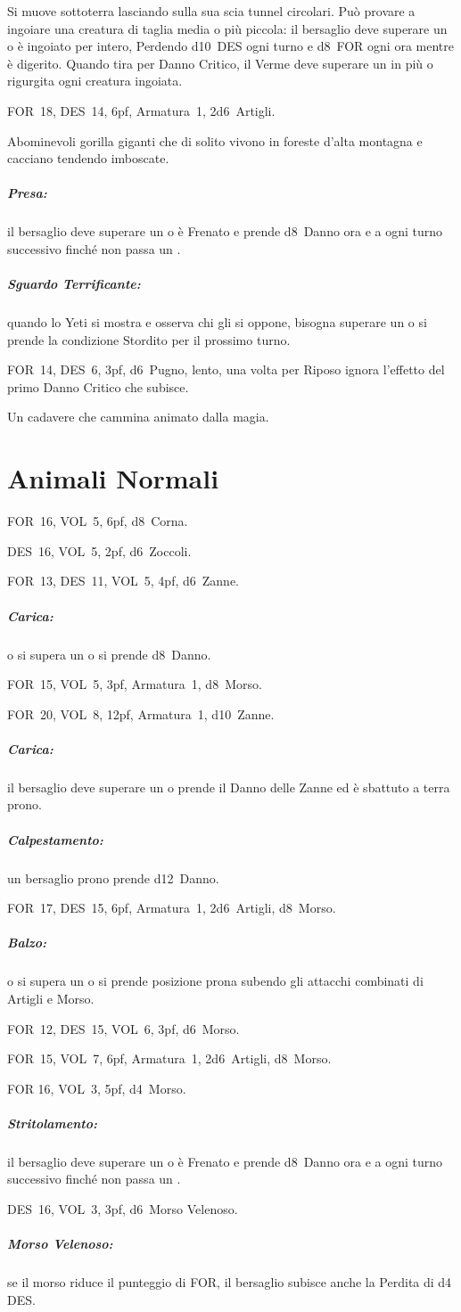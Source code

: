 \documentclass[itdr]{subfiles}
\begin{document}
Si muove sottoterra lasciando sulla sua scia tunnel circolari. Può provare a ingoiare una creatura di taglia media o più piccola: il bersaglio deve superare un  o è ingoiato per intero, Perdendo d10~DES ogni turno e d8~FOR ogni ora mentre è digerito. Quando tira per Danno Critico, il Verme deve superare un  in più o rigurgita ogni creatura ingoiata.

\vfill

FOR~18, DES~14, 6pf, Armatura~1, 2d6~Artigli.

Abominevoli gorilla giganti che di solito vivono in foreste d'alta montagna e cacciano tendendo imboscate.

\subparagraph{Presa:} il bersaglio deve superare un  o è Frenato e prende d8~Danno ora e a ogni turno successivo finché non passa un .

\subparagraph{Sguardo Terrificante:} quando lo Yeti si mostra e osserva chi gli si oppone, bisogna superare un  o si prende la condizione Stordito per il prossimo turno.

\break

FOR~14, DES~6, 3pf, d6~Pugno, lento, una volta per Riposo \mbox{ignora} l'effetto del primo Danno Critico che subisce.

Un cadavere che cammina animato dalla magia.

\section{Animali Normali}

FOR~16, VOL~5, 6pf, d8~Corna.

DES~16, VOL~5, 2pf, d6~Zoccoli.

FOR~13, DES~11, VOL~5, 4pf, d6~Zanne.
\subparagraph{Carica:} o si supera un  o si prende d8~Danno.

FOR~15, VOL~5, 3pf, Armatura~1, d8~Morso.

FOR~20, VOL~8, 12pf, Armatura~1, d10~Zanne.
\subparagraph{Carica:} il bersaglio deve superare un  o prende il Danno delle Zanne ed è sbattuto a terra prono.
\subparagraph{Calpestamento:} un bersaglio prono prende d12~Danno.

FOR~17, DES~15, 6pf, Armatura~1, 2d6~Artigli, d8~Morso.
\subparagraph{Balzo:} o si supera un  o si prende posizione prona subendo gli attacchi combinati di Artigli e Morso.

FOR~12, DES~15, VOL~6, 3pf, d6~Morso.

FOR~15, VOL~7, 6pf, Armatura~1, 2d6~Artigli, d8~Morso.

FOR 16, VOL~3, 5pf, d4~Morso.
\subparagraph{Stritolamento:} il bersaglio deve superare un  o è Frenato e prende d8~Danno ora e a ogni turno successivo finché non passa un .

DES~16, VOL~3, 3pf, d6~Morso Velenoso.
\subparagraph{Morso Velenoso:} se il morso riduce il punteggio di FOR, il bersaglio subisce anche la Perdita di d4 DES.
~
\end{document}
